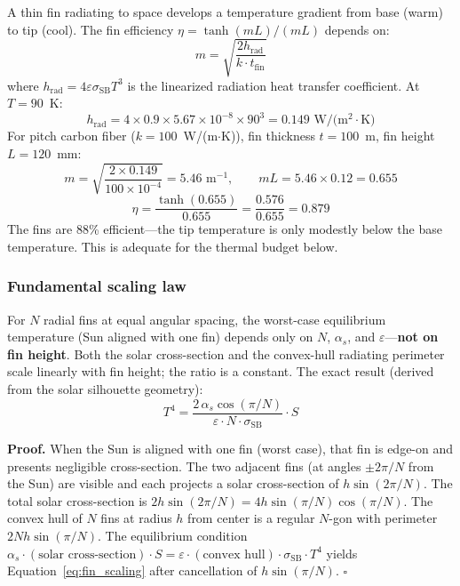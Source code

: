 \documentclass[12pt,letterpaper]{article}
\begin{document}
A thin fin radiating to space develops a temperature gradient from base (warm) to tip (cool). The fin efficiency $\eta = \tanh(mL)/(mL)$ depends on:
\begin{equation}
m = \sqrt{\frac{2 h_{\text{rad}}}{k \cdot t_{\text{fin}}}}
\end{equation}
where $h_{\text{rad}} = 4\varepsilon\sigma_{\text{SB}} T^3$ is the linearized radiation heat transfer coefficient. At $T = 90$~K:
\[
h_{\text{rad}} = 4 \times 0.9 \times 5.67 \times 10^{-8} \times 90^3 = 0.149 \text{~W/(m$^2\cdot$K)}
\]
For pitch carbon fiber ($k = 100$~W/(m$\cdot$K)), fin thickness $t = 100$~\textmu m, fin height $L = 120$~mm:
\[
m = \sqrt{\frac{2 \times 0.149}{100 \times 10^{-4}}} = 5.46 \text{~m}^{-1}, \qquad
mL = 5.46 \times 0.12 = 0.655
\]
\begin{equation}
\eta = \frac{\tanh(0.655)}{0.655} = \frac{0.576}{0.655} = 0.879
\end{equation}
The fins are 88\% efficient---the tip temperature is only modestly below the base temperature. This is adequate for the thermal budget below.

\subsubsection{Fundamental scaling law}

For $N$ radial fins at equal angular spacing, the worst-case equilibrium temperature (Sun aligned with one fin) depends only on $N$, $\alpha_s$, and $\varepsilon$---\textbf{not on fin height}. Both the solar cross-section and the convex-hull radiating perimeter scale linearly with fin height; the ratio is a constant. The exact result (derived from the solar silhouette geometry):
\begin{equation}\label{eq:fin_scaling}
\boxed{T^4 = \frac{2\,\alpha_s \cos(\pi/N)}{\varepsilon \cdot N \cdot \sigma_{\text{SB}}} \cdot S}
\end{equation}

\textbf{Proof.} When the Sun is aligned with one fin (worst case), that fin is edge-on and presents negligible cross-section. The two adjacent fins (at angles $\pm 2\pi/N$ from the Sun) are visible and each projects a solar cross-section of $h \sin(2\pi/N)$. The total solar cross-section is $2h\sin(2\pi/N) = 4h\sin(\pi/N)\cos(\pi/N)$. The convex hull of $N$ fins at radius $h$ from center is a regular $N$-gon with perimeter $2Nh\sin(\pi/N)$. The equilibrium condition $\alpha_s \cdot (\text{solar cross-section}) \cdot S = \varepsilon \cdot (\text{convex hull}) \cdot \sigma_{\text{SB}} \cdot T^4$ yields Equation~\ref{eq:fin_scaling} after cancellation of $h\sin(\pi/N)$. \hfill$\square$
\end{document}
